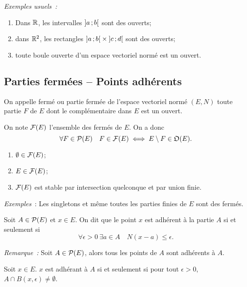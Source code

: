 \emph{Exemples usuels~:}
\begin{enumerate}
\item Dans $\R$, les intervalles $\intervalleoo{a}{b}$ sont des ouverts;
\item dans $\R^2$, les rectangles $\intervalleoo{a}{b}\times\intervalleoo{c}{d}$ sont des ouverts;
\item toute boule ouverte d'un espace vectoriel normé est un ouvert.
\end{enumerate}

\subsection{Parties fermées -- Points adhérents}

\begin{defdef}
  On appelle fermé ou partie fermée de l'espace vectoriel normé $(E, N)$ toute partie $F$ de $E$ dont le complémentaire dans $E$ est un ouvert.

  On note $\F(E)$ l'ensemble des fermés de $E$. On a donc
  \begin{equation}
    \forall F \in \P(E) \quad F \in \F(E) \iff E\setminus F \in \Oouvert(E).
  \end{equation}
\end{defdef}
\begin{prop}
  \begin{enumerate}
  \item $\emptyset \in \F(E)$;
  \item $E \in \F(E)$;
  \item $\F(E)$ est stable par intersection quelconque et par union finie.
  \end{enumerate}
\end{prop}
%
\emph{Exemples}~: Les singletons et même toutes les parties finies de $E$ sont des fermés.
%
\begin{defdef}
  Soit $A \in \P(E)$ et $x \in E$. On dit que le point $x$ est adhérent à la partie $A$ si et seulement si
  \begin{equation}
    \forall \epsilon>0 \ \exists a \in A \quad N(x-a) \leqslant \epsilon.
  \end{equation}
\end{defdef}
\emph{Remarque~:} Soit $A \in \P(E)$, alors tous les points de $A$ sont adhérents à $A$.
\begin{defdef}
  Soit $x \in E$. $x$ est adhérant à $A$ si et seulement si pour tout $\epsilon>0$, $A \cap B(x, \epsilon) \neq \emptyset$.
\end{defdef}

